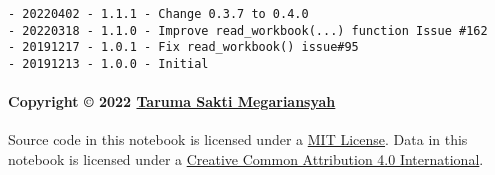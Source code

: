 \documentclass[11pt]{article}
\begin{document}
\begin{verbatim}
- 20220402 - 1.1.1 - Change 0.3.7 to 0.4.0
- 20220318 - 1.1.0 - Improve read_workbook(...) function Issue #162
- 20191217 - 1.0.1 - Fix read_workbook() issue#95
- 20191213 - 1.0.0 - Initial
\end{verbatim}

\hypertarget{copyright-2022-taruma-sakti-megariansyah}{%
\paragraph{\texorpdfstring{Copyright © 2022
\href{https://taruma.github.io}{Taruma Sakti
Megariansyah}}{Copyright © 2022 Taruma Sakti Megariansyah}}\label{copyright-2022-taruma-sakti-megariansyah}}

Source code in this notebook is licensed under a
\href{https://choosealicense.com/licenses/mit/}{MIT License}. Data in
this notebook is licensed under a
\href{https://creativecommons.org/licenses/by/4.0/}{Creative Common
Attribution 4.0 International}.


    
    
    
\end{document}
